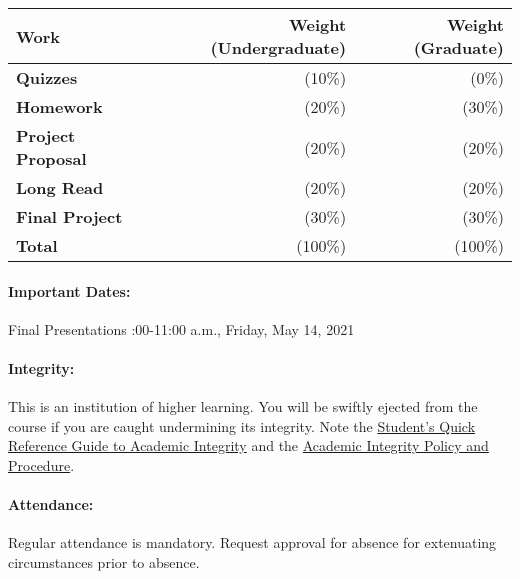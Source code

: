 \documentclass[11pt, a4paper]{article}
\begin{document}
\begin{table}[h]
\begin{tabularx}{\textwidth}{Xrr}
        \textbf{Work} & \textbf{Weight (Undergraduate)} & \textbf{Weight (Graduate)} \\
\hline
\textbf{Quizzes}           & (10\%)   & (0\%)\\
\textbf{Homework}          & (20\%)   & (30\%)\\
\textbf{Project Proposal}  & (20\%)   & (20\%)\\
\textbf{Long Read}         & (20\%)   & (20\%)\\
\textbf{Final Project}     & (30\%)   & (30\%)\\
\hline
\textbf{Total}             & (100\%) & (100\%)\\
\end{tabularx}
\end{table}

\paragraph{Important Dates:}
\begin{center} \begin{minipage}{3.8in}
\begin{flushleft}
Final Presentations       :00-11:00 a.m., Friday, May 14, 2021\\
\end{flushleft}
\end{minipage}
\end{center}

\paragraph{Integrity:} This is an institution of higher learning. You will 
        be swiftly ejected from the course if you are caught undermining its 
                integrity. Note the 
                \href{http://www.provost.illinois.edu/academicintegrity/students.html}{Student's 
                Quick Reference Guide to Academic Integrity} and the 
                \href{http://studentcode.illinois.edu/article1_part4_1-401.html}{Academic 
                Integrity Policy and Procedure}.
\paragraph{Attendance:} Regular attendance is mandatory. Request approval
        for absence for extenuating circumstances prior to absence.
\end{document}
